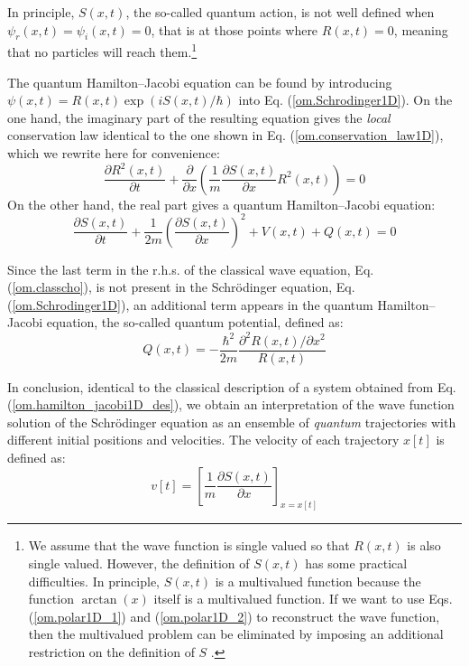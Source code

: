 \documentclass[nofootinbib, secnumarabic, amsmath, nobibnotes,11pt,aps,pra, floatfix]{revtex4-1}
\newcommand{\eref}[1]{Eq. (\ref{#1})}
\begin{document}
In principle, $S(x,t)$, the so-called quantum action, is not well defined when $\psi_r(x,t) =
\psi_i(x,t) = 0$, that is  at those points where $R(x,t) = 0$, meaning that no
particles will reach them.\footnote{We assume that the wave function
is single valued so that $R(x,t)$ is also single valued. However,
the definition of $S(x,t)$ has some practical difficulties. In
principle, $S(x,t)$ is a multivalued function because the function
$\arctan(x)$ itself is a multivalued function. If we want to use
Eqs. (\ref{om.polar1D_1}) and (\ref{om.polar1D_2}) to reconstruct
the wave function, then the multivalued problem can be eliminated by
imposing an  additional restriction on the definition of
$S$ \cite{om.Holand1993,om.Bohm1993,om.Durrllibre,om.reviewabc,om.llibreph}.}

The quantum Hamilton--Jacobi equation can be found by introducing $\psi(x,t) = R(x,t) \exp(i S(x,t)/\hbar)$ into \eref{om.Schrodinger1D}. On the one hand, the imaginary part of the resulting equation gives the \textit{local} conservation law identical to the one shown in \eref{om.conservation_law1D}, which we rewrite here for convenience:
\begin{equation}
\frac{\partial R^2(x,t)}{\partial t} + \frac {\partial } {\partial x} \left(\frac {1} {m} \frac {\partial S(x,t)}{\partial x} R^2(x,t) \right) = 0
\end{equation}
On the other hand, the real part gives a quantum Hamilton--Jacobi equation:
\begin{equation}
\label{om.hamilton_jacobi1D_des}
\frac{\partial S(x,t)}{\partial t} + \frac {1} {2 m} \left(\frac{ \partial S(x,t)} {\partial x} \right)^2 + V(x,t) + Q(x,t) = 0
\end{equation}

Since the last term in the r.h.s. of the classical wave equation, \eref{om.classcho}, is not present in the Schr\"odinger equation, \eref{om.Schrodinger1D}, an additional term appears in the quantum Hamilton--Jacobi equation, the so-called quantum potential, defined as:
\begin{equation}
\label{om.quantum_potential1D}
Q(x,t) = -\frac{\hbar^2} {2 m} \frac{{\partial}^2 R(x,t)/ \partial x^2} {R(x,t)}
\end{equation}

In conclusion, identical to the classical description of a system obtained from \eref{om.hamilton_jacobi1D_des}, we obtain an interpretation of the wave function solution of the Schr\"odinger equation as an ensemble of \textit{quantum} trajectories with different initial positions and velocities.
The velocity of each trajectory $x[t]$ is defined as:
\begin{equation}
\label{om.velocity_dSdx}
v[t] = \left[\frac{1}{m} \frac{\partial S(x,t)}{\partial x}\right]_{x = x[t]}
\end{equation}
\end{document}
